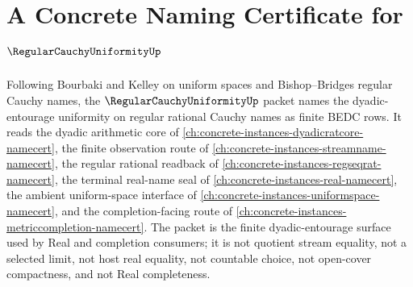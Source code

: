 \chapter{A Concrete Naming Certificate for $\RegularCauchyUniformityUp$}
\label{ch:concrete-instances-regularcauchyuniformity-namecert}

Following Bourbaki and Kelley on uniform spaces and Bishop--Bridges regular Cauchy names, the $\RegularCauchyUniformityUp$ packet names the dyadic-entourage uniformity on regular rational Cauchy names as finite BEDC rows. It reads the dyadic arithmetic core of \autoref{ch:concrete-instances-dyadicratcore-namecert}, the finite observation route of \autoref{ch:concrete-instances-streamname-namecert}, the regular rational readback of \autoref{ch:concrete-instances-regseqrat-namecert}, the terminal real-name seal of \autoref{ch:concrete-instances-real-namecert}, the ambient uniform-space interface of \autoref{ch:concrete-instances-uniformspace-namecert}, and the completion-facing route of \autoref{ch:concrete-instances-metriccompletion-namecert}. The packet is the finite dyadic-entourage surface used by Real and completion consumers; it is not quotient stream equality, not a selected limit, not host real equality, not countable choice, not open-cover compactness, and not Real completeness.

